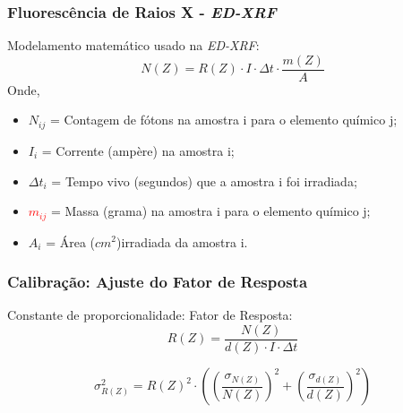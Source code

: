 \begin{frame}
  \frametitle{}

\end{frame}

\begin{frame}
  \frametitle{}
\end{frame}

\begin{frame}
  \frametitle{Fluorescência de Raios X - \textit{ED-XRF}}
  Modelamento matemático usado na \textit{ED-XRF}:
  \begin{equation}
    \label{eq:contagem}
    N(Z) = R(Z) \cdot I \cdot \Delta t  \cdot \frac{m(Z)}{A}
  \end{equation}
  Onde,  
  \begin{itemize}
    \item $N_{ij}$ = Contagem de fótons na amostra i para o elemento químico j;
    \item $I_{i}$ = Corrente (ampère) na amostra i;
    \item $\Delta t_i$ = Tempo vivo (segundos) que a amostra i foi irradiada;
    \item \textcolor{red}{$m_{ij}$} = Massa (grama) na amostra i para o elemento químico j;
    \item $A_i$ = Área ($cm^2$)irradiada da amostra i.
  \end{itemize}
\end{frame}

\begin{frame}
  \frametitle{Calibração: Ajuste do Fator de Resposta}
  Constante de proporcionalidade: Fator de Resposta:
\begin{equation}
  \label{eq:fator_de_resposta}
  R(Z) = \frac{N(Z)}{d(Z) \cdot I \cdot \Delta t}
\end{equation}

\begin{equation}
  \label{eq:erro_fator_de_resposta}
  \sigma_{R(Z)}^2 = {R(Z)}^2 \cdot \left( \left(\frac{\sigma_{N(Z)}}{N(Z)}\right)^2 + 
                                      \left(\frac{\sigma_{d(Z)}}{d(Z)}\right)^2 
                                   \right)
\end{equation}
\end{frame}

